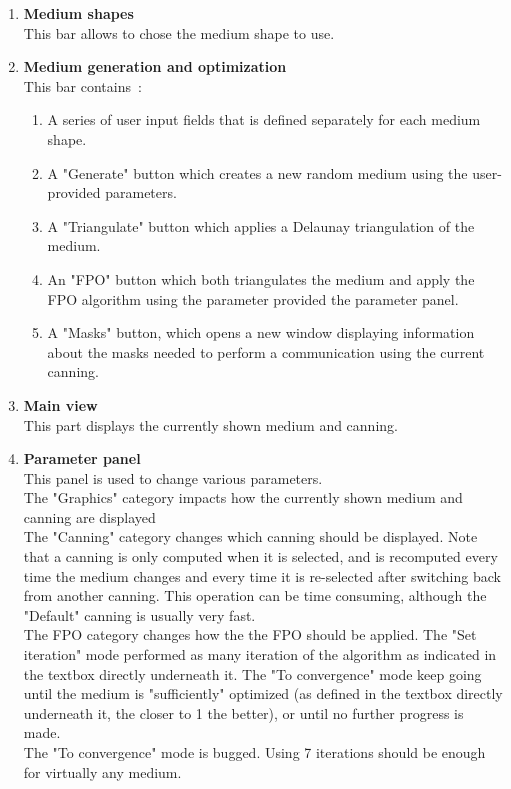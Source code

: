 \documentclass{report}
\newcommand{\warning}{{\fontencoding{U}\fontfamily{futs}\selectfont\char 66\relax}}
\begin{document}
\begin{enumerate}
	\item \textbf{Medium shapes}\\
	This bar allows to chose the medium shape to use.
	
	\item \textbf{Medium generation and optimization}\\
	This bar contains~:
	\begin{enumerate}
		\item A series of user input fields that is defined separately for each medium shape.
		\item A "Generate" button which creates a new random medium using the user-provided parameters.
		\item A "Triangulate" button which applies a Delaunay triangulation of the medium.
		\item An "FPO" button which both triangulates the medium and apply the FPO algorithm using the parameter provided the parameter panel.
		\item A "Masks" button, which opens a new window displaying information about the masks needed to perform a communication using the current canning. 
	\end{enumerate}

	\item \textbf{Main view}\\
	This part displays the currently shown medium and canning.
	
	\item \textbf{Parameter panel}\\
	This panel is used to change various parameters.\\
	The "Graphics" category impacts how the currently shown medium and canning are displayed\\
	The "Canning" category changes which canning should be displayed. Note that a canning is only computed when it is selected, and is recomputed every time the medium changes and every time it is re-selected after switching back from another canning. This operation can be time consuming, although the "Default" canning is usually very fast.\\
	The FPO category changes how the the FPO should be applied. The "Set iteration" mode performed as many iteration of the algorithm as indicated in the textbox directly underneath it. The "To convergence" mode keep going until the medium is "sufficiently" optimized (as defined in the textbox directly underneath it, the closer to 1 the better), or until no further progress is made. \\
	\warning The "To convergence" mode is bugged. Using 7 iterations should be enough for virtually any medium.
	

\end{enumerate}
\end{document}
